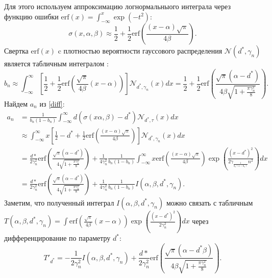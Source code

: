 \documentclass{mipt-thesis-bs}
\begin{document}
Для этого используем аппроксимацию логнормальныого интеграла через функцию ошибки $\text{erf}(x) = \int_{-\infty}^x \exp(-t^2)$:
\begin{equation}
     \sigma(x, \alpha, \beta) \approx \frac{1}{2} + \frac{1}{2} \text{erf}\left(\frac{(x-\alpha)\sqrt{\pi}}{4 \beta}\right).   
\end{equation}
Свертка  $\text{erf}(x)$ c плотностью вероятности гауссового распределения $\mathcal{N}(d^*,\gamma_n)$ является табличным интегралом \cite{ng1969table}:
\begin{equation}
    b_n \approx \int_{-\infty}^{\infty} \left[\frac{1}{2} + \frac{1}{2} \text{erf}\left(\frac{\sqrt{\pi}}{4\beta} (x-\alpha) \right) \right] \mathcal{N}_{d^*,\gamma_n}(x) dx = 
    \frac{1}{2} + \frac{1}{2} \text{erf}\left(\frac{\sqrt{\pi} (\alpha-d^*)}{4 \beta \sqrt{1+\frac{\pi\gamma_n^2}{8}}} \right).
\end{equation}
Найдем $a_n$ из \ref{diff}:
\begin{equation}
    \label{a_n}
    \begin{aligned}
          a_n &= \frac{1}{b_n(1-b_n)} \int_{-\infty}^{\infty} d (\sigma(x\alpha,\beta) -d^*) \mathcal{N}_{d^*,\tau}(x)  dx \\  
          &\approx  \int_{-\infty}^{\infty} x \left[\frac{1}{2} - d^* + \frac{1}{2} \text{erf}\left(\frac{(x-\alpha)\sqrt{\pi}}{4 \beta}\right)\right] \mathcal{N}_{d^*,\gamma_n}(x) dx \\
          &= \frac{d*}{2 \gamma_n^2} \text{erf}\left(\frac{\sqrt{\pi} (\alpha-d^*)}{4 \sqrt{1+\frac{\pi\gamma_n^2}{8}}} \right)  + \frac{1}{4 \gamma_n^2} \frac{1}{b_n(1-b_n)} \int_{-\infty}^{\infty} x \text{erf}\left(\frac{(x-\alpha)\sqrt{\pi}}{4 \beta}\right) \exp\left(\frac{(x-d^*)^2}{2 \gamma_\frac{1}{b_n(1-b_n)}n^2}\right) dx \\
          & = \frac{d*}{2 \gamma_n^2} \text{erf}\left(\frac{\sqrt{\pi} (\alpha-d^*)}{4 \sqrt{1+\frac{\pi\gamma_n^2}{8}}} \right) + \frac{1}{4 \gamma_n^2} \frac{1}{b_n(1-b_n)} I(\alpha,\beta,d^*,\gamma_n).
    \end{aligned}
\end{equation}
Заметим, что полученный интеграл $I(\alpha,\beta,d^*,\gamma_n)$ можно связать с табличным  
$T(\alpha,\beta,d^*,\gamma_n) = \int\text{erf}\left(\frac{\sqrt{\pi}}{4\beta} (x-\alpha) \right) \exp\left(\frac{(x-d^*)^2}{2 \gamma_n^2}\right) dx$ через дифференцирование по параметру $d^*$: 
\begin{equation}
    \label{left}
    T'_{d^*} = - \frac{1}{2\gamma_n^2}I(\alpha,\beta,d^*,\gamma_n) + \frac{d*}{2 \gamma_n^2} \text{erf}\left(\frac{\sqrt{\pi} (\alpha-d^* \beta )}{4 \beta \sqrt{1+\frac{\pi\gamma_n^2}{8}}} \right) .
\end{equation}
\end{document}
